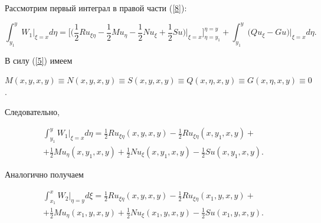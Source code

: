 Рассмотрим первый интеграл в правой части (\ref{8}):


\begin{equation*} %


\int_{y_{1}}^{y} W_1 \big\vert_{\xi=x} d\eta=


\bigg [ \bigg( \frac{1}{2}Ru_{\xi\eta}-\frac{1}{2}Mu_\eta


-\frac{1}{2}Nu_\xi+\frac{1}{2}Su\bigg)\bigg\vert_{\xi=x}\bigg]_{\eta=y_1}


^{\eta=y} +


\int_{y_{1}}^{y}\big(Qu_{\xi}-Gu\big)\big\vert_{\xi=x}d\eta.


\end{equation*}





В силу (\ref{5}) имеем


$M(x,y,x,y)\equiv N(x,y,x,y)\equiv S(x,y,x,y)\equiv


Q(x,\eta,x,y)\equiv G(x,\eta,x,y)\equiv 0$.


Следовательно,


\begin{multline*}


\int_{y_{1}}^{y} W_1 \big\vert_{\xi=x} d\eta=


\frac{1}{2}Ru_{\xi\eta}(x,y,x,y)-\frac{1}{2}Ru_{\xi\eta}(x,y_1,x,y)+\\


+\frac{1}{2}Mu_{\eta}(x,y_1,x,y)+\frac{1}{2}Nu_{\xi}(x,y_1,x,y)


-\frac{1}{2}Su(x,y_1,x,y).


\end{multline*}





Аналогично получаем


\begin{multline*}


\int_{x_{1}}^{x} W_2 \big\vert_{\eta=y} d\xi=


\frac{1}{2}Ru_{\xi\eta}(x,y,x,y)-\frac{1}{2}Ru_{\xi\eta}(x_1,y,x,y)+\\


+\frac{1}{2}Mu_{\eta}(x_1,y,x,y)+\frac{1}{2}Nu_{\xi}(x_1,y,x,y)


-\frac{1}{2}Su(x_1,y,x,y).


\end{multline*}





